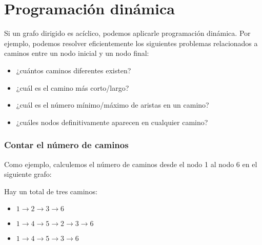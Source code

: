 \section{Programación dinámica}

Si un grafo dirigido es acíclico, podemos aplicarle programación
dinámica. Por ejemplo, podemos resolver eficientemente los siguientes
problemas relacionados a caminos entre un nodo inicial y un nodo final:

\begin{itemize}
    \item ¿cuántos caminos diferentes existen?
    \item ¿cuál es el camino más corto/largo?
    \item ¿cuál es el número mínimo/máximo de aristas en un camino?
    \item ¿cuáles nodos definitivamente aparecen en cualquier camino?
\end{itemize}

\subsubsection{Contar el número de caminos}

Como ejemplo, calculemos el número de caminos desde el nodo 1
al nodo 6 en el siguiente grafo:
\begin{center}
\end{center}

Hay un total de tres caminos:
\begin{itemize}
    \item $1 \rightarrow 2 \rightarrow 3 \rightarrow 6$
    \item $1 \rightarrow 4 \rightarrow 5 \rightarrow 2 \rightarrow 3 \rightarrow 6$
    \item $1 \rightarrow 4 \rightarrow 5 \rightarrow 3 \rightarrow 6$
\end{itemize}

